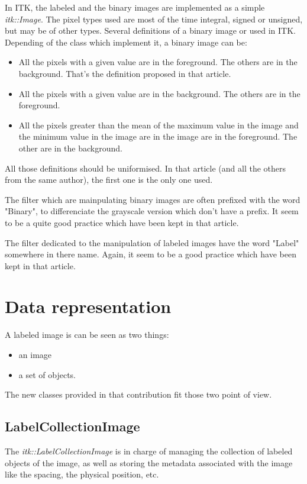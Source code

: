 \documentclass{InsightArticle}
\begin{document}
In ITK, the labeled and the binary images are implemented as a simple {\em itk::Image}. The pixel types used are most of the time integral, signed or unsigned, but may be of other types.
Several definitions of a binary image or used in ITK. Depending of the class which implement it, a binary image can be:
\begin{itemize}
  \item All the pixels with a given value are in the foreground. The others are in the background. That's the definition proposed in that article.
  \item All the pixels with a given value are in the background. The others are in the foreground.
  \item All the pixels greater than the mean of the maximum value in the image and the minimum value in the image are in the image are in the foreground. The other are in the background.
\end{itemize}
All those definitions should be uniformised. In that article (and all the others from the same author), the first one is the only one used.

The filter which are mainpulating binary images are often prefixed with the word "Binary", to differenciate the grayscale version which don't have a prefix. It seem to be a quite good practice which have been kept in that article.

The filter dedicated to the manipulation of labeled images have the word "Label" somewhere in there name. Again, it seem to be a good practice which have been kept in that article.


\section{Data representation}

A labeled image is can be seen as two things:
\begin{itemize}
  \item  an image
  \item  a set of objects.
\end{itemize}

The new classes provided in that contribution fit those two point of view.

\subsection{LabelCollectionImage}

The {\em itk::LabelCollectionImage} is in charge of managing the collection of labeled
objects of the image, as well as storing the metadata associated with the image like
the spacing, the physical position, etc.
\end{document}
